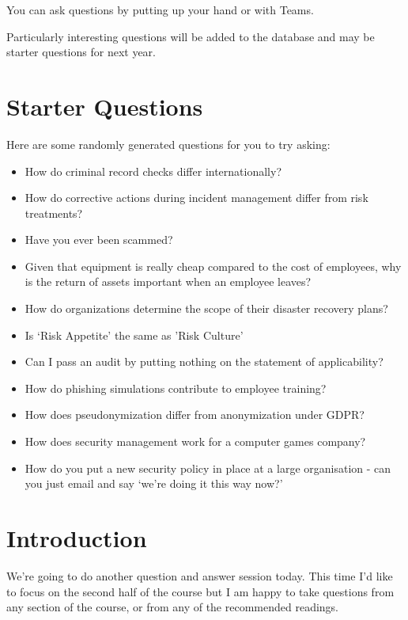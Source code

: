 \documentclass[12pt]{article}
\begin{document}
You can ask questions by putting up your hand or with Teams.  

Particularly interesting questions will be added to the database and may be starter questions for next year.  

\section*{Starter Questions} 
Here are some randomly generated questions for you to try asking: 

\begin{itemize}
  \item How do criminal record checks differ internationally?
  \item How do corrective actions during incident management differ from risk treatments?
  \item Have you ever been scammed?
  \item Given that equipment is really cheap compared to the cost of employees, why is the return of assets important when an employee leaves?
  \item How do organizations determine the scope of their disaster recovery plans?
  \item Is `Risk Appetite' the same as 'Risk Culture'
  \item Can I pass an audit by putting nothing on the statement of applicability?
  \item How do phishing simulations contribute to employee training?
  \item How does pseudonymization differ from anonymization under GDPR?
  \item How does security management work for a computer games company?
  \item How do you put a new security policy in place at a large organisation - can you just email and say `we're doing it this way now?'
\end{itemize}


%
%



\maketitle

\section*{Introduction}
We're going to do another question and answer session today. This time I'd like to focus on the second half of the course but I am happy to take questions from any section of the course, or from any of the recommended readings. 
\end{document}
